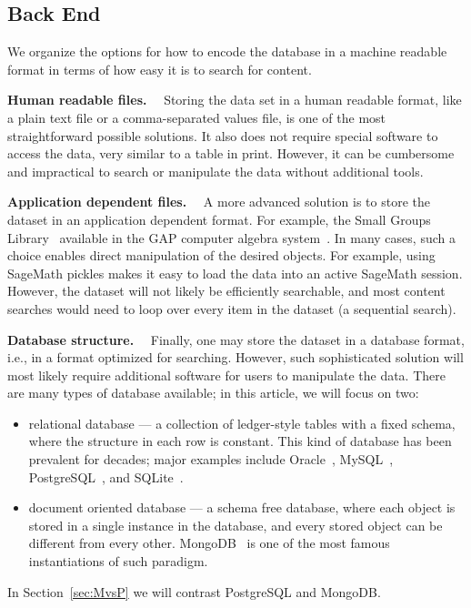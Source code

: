 \documentclass{amsart}
\newcommand{\subhead}[1]{\vspace{0.1in} \noindent \textbf{#1.}\ \ }
\begin{document}
\subsection{Back End}

We organize the options for how to encode the database in a machine readable format in terms of how easy it is to search for content.


\subhead{Human readable files}
     Storing the data set in a human readable format, like a  plain text file or a comma-separated values file, is one of the most straightforward possible solutions.
     It also does not require special software to access the data, very similar to a table in print.
    However, it can be cumbersome and impractical to search or manipulate the data without additional tools.

\subhead{Application dependent files}
    A more advanced solution is to store the dataset in an application dependent format.
    For example, the Small Groups Library~\cite{smallgroups} available in the GAP computer algebra system~\cite{gap}.
    In many cases, such a choice enables direct manipulation of the desired objects.
    For example, using SageMath pickles makes it easy to load the data into an active SageMath session.
    However, the dataset will not likely be efficiently searchable, and most content searches would need to loop over every item in the dataset (a sequential search).

\subhead{Database structure}
    Finally, one may store the dataset in a database format, i.e., in a format optimized for searching.
    However, such sophisticated solution will most likely require additional software for users to manipulate the data.
    There are many types of database available; in this article, we will focus on two:
    \begin{itemize}
      \item relational database --- a collection of ledger-style tables with a fixed schema, where the structure in each row is constant.
        This kind of database has been prevalent for decades; major examples include Oracle~\cite{oracle}, MySQL~\cite{mysql}, PostgreSQL~\cite{postgres}, and SQLite~\cite{sqlite}.
      \item document oriented database --- a schema free database, where each object is stored in a single instance in the database, and every stored object can be different from every other.
        MongoDB~\cite{mongo} is one of the most famous instantiations of such paradigm.
    \end{itemize}
    In Section~\ref{sec:MvsP} we will contrast PostgreSQL and MongoDB.
\end{document}
